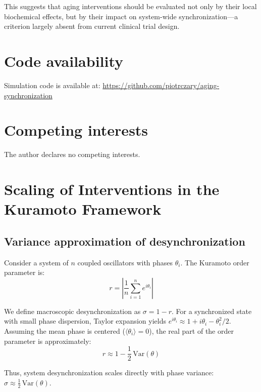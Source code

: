 \documentclass[12pt]{article}
\begin{document}
This suggests that aging interventions should be evaluated not only by their
local biochemical effects, but by their impact on system-wide synchronization---a
criterion largely absent from current clinical trial design.

\section*{Code availability}

Simulation code is available at:
\url{https://github.com/piotrczary/aging-synchronization}

\section*{Competing interests}

The author declares no competing interests.

\appendix

\section{Scaling of Interventions in the Kuramoto Framework}
\label{app:scaling}

\subsection{Variance approximation of desynchronization}

Consider a system of $n$ coupled oscillators with phases $\theta_i$. The
Kuramoto order parameter is:
\begin{equation}
r = \left|\frac{1}{n}\sum_{i=1}^{n} e^{i\theta_i}\right|
\end{equation}

We define macroscopic desynchronization as $\sigma = 1 - r$. For a synchronized
state with small phase dispersion, Taylor expansion yields
$e^{i\theta_i} \approx 1 + i\theta_i - \theta_i^2/2$. Assuming the mean phase
is centered ($\langle\theta_i\rangle = 0$), the real part of the order
parameter is approximately:
\begin{equation}
r \approx 1 - \frac{1}{2}\,\mathrm{Var}(\theta)
\end{equation}

Thus, system desynchronization scales directly with phase variance:
$\sigma \approx \frac{1}{2}\,\mathrm{Var}(\theta)$.
\end{document}
